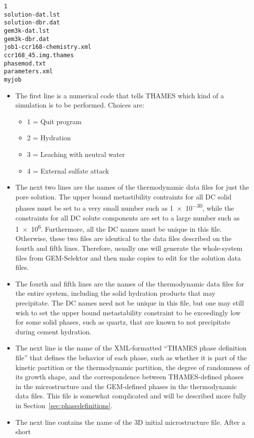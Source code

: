 \documentclass{article}
\begin{document}
\begin{lstlisting}[frame=trBL]
1
solution-dat.lst
solution-dbr.dat
gem3k-dat.lst
gem3k-dbr.dat
job1-ccr168-chemistry.xml
ccr168_45.img.thames
phasemod.txt
parameters.xml
myjob
\end{lstlisting}

\begin{itemize}
	\item The first line is a numerical code that tells THAMES which kind of a
	simulation is to be performed.  Choices are:
		\begin{itemize}
			\item 1 = Quit program
			\item 2 = Hydration
			\item 3 = Leaching with neutral water
			\item 4 = External sulfate attack
		\end{itemize}
	\item The next two lines are the names of the thermodynamic data files for just the pore
	solution.  The upper bound metastibility contraints for all DC solid phases
	must be set to a very small number such as \num{1e-30}, while the
	constraints for all DC solute components are set to a large number such as
	\num{1e6}.  Furthermore, all the DC names must be unique in this file.
	Otherwise, these two files are identical to the data files
	described on the fourth and fifth lines.  Therefore, usually one will
	generate the whole-system files from GEM-Selektor and then make copies
	to edit for the solution data files.
	\item The fourth and fifth lines are the names of the thermodynamic data files for the
	entire system, including the solid hydration products that may precipitate.
	The DC names need not be unique in this file, but one may still wish to
	set the upper bound metastability constraint to be exceedingly low for
	some solid phases, such as quartz, that are known to not precipitate during
	cement hydration.
	\item The next line is the name of the XML-formatted ``THAMES phase definition file'' that defines
	the behavior of
	each phase, such as whether it is part of the kinetic partition or the
	thermodynamic partition, the degree of randomness of its growth shape, and
	the correspondence between THAMES-defined phases in the microstructure and
	the GEM-defined phases in the thermodynamic data files.  This file is
	somewhat complicated and will be described more fully in Section~\ref{sec:phasedefinitions}.
	\item The next line contains the name of the 3D initial microstructure file.  After a short

\end{itemize}
\end{document}
